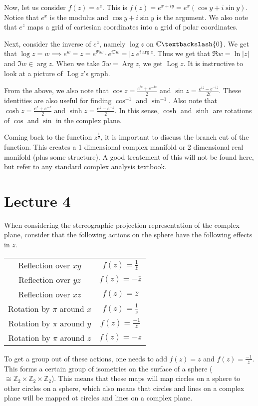 \documentclass[11pt,leqno,oneside]{amsart}
\newcommand{\Z}{{\mathbb Z}} %
\newcommand{\C}{{\mathbb C}} %
\newcommand{\Arg}{\operatorname{Arg}}
\newcommand{\Log}{\operatorname{Log}}
\theoremstyle{definition}
\numberwithin{equation}{section}
\begin{document}
Now, let us consider $f(z) = e^z$. This is $f(z) = e^{x+iy} = e^x(\cos y +
i\sin y)$. Notice that $e^x$ is the modulus and $\cos y + i \sin y$ is the
argument. We also note that $e^z$ maps a grid of cartesian coordinates into a
grid of polar coordinates. 

Next, consider the inverse of $e^z$, namely $\log z$ on $\C \textbackslash
\{0\}$. We get that $\log z = w \implies e^w = z = e^{\Re w} \cdot e^{i \Im w}
= |z|e^{i \arg z}$. Thus we get that $\Re w = \ln|z|$ and $\Im w \in \arg z$.
When we take $\Im w = \Arg z$, we get $\Log z$. It is instructive to look at a
picture of $\Log z$'s graph.

From the above, we also note that $\cos z = \frac{e^{iz}+e^{-iz}}{2}$ and $\sin
z = \frac{e^{iz}-e^{-iz}}{2i}$. These identities are also useful for finding
$\cos^{-1}$ and $\sin^{-1}$. Also note that $\cosh z = \frac{e^z+e^{-z}}{2}$
and $\sinh z = \frac{e^z-e^{-z}}{2}$. In this sense, $\cosh$ and $\sinh$ are
rotations of $\cos$ and $\sin$ in the complex plane.

Coming back to the function $z^{\frac{1}{2}}$, it is important to discuss the
branch cut of the function. This creates a 1 dimensional complex manifold or
2 dimensional real manifold (plus some structure). A good treatement of this
will not be found here, but refer to any standard complex analysis textbook.

\section{Lecture 4}
When considering the stereographic projection representation of the complex
plane, consider that the following actions on the sphere have the following
effects in $z$.

\begin{tabular}{|c|c|}
    \hline
    Reflection over $xy$ & $f(z) = \frac{1}{\overline{z}}$ \\
    Reflection over $yz$ & $f(z) = -\overline{z}$ \\
    Reflection over $xz$ & $f(z) = \overline{z}$ \\
    Rotation by $\pi$ around $x$ & $f(z) = \frac{1}{z}$ \\
    Rotation by $\pi$ around $y$ & $f(z) = \frac{-1}{z}$ \\
    Rotation by $\pi$ around $z$ & $f(z) = -z$ \\
    \hline
\end{tabular}

To get a group out of these actions, one needs to add $f(z) = z$ and $f(z) = \frac{-1}{\overline{z}}$. This forms a certain group of isometries on the surface of a sphere ($\cong \Z_2 \times \Z_2 \times \Z_2$). This means that these maps will map circles on a sphere to other circles on a sphere, which also means that circles and lines on a complex plane will be mapped ot circles and lines on a complex plane. 
\end{document}
